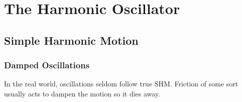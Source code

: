 \documentclass[math,code]{amznotes}
\theoremstyle{remark}
\begin{document}
\tableofcontents

\chapter{The Harmonic Oscillator}
\section{Simple Harmonic Motion}
\subsection{Damped Oscillations}
In the real world, oscillations seldom follow true SHM. Friction of some sort usually acts to dampen the motion so it dies away.
\end{document}

